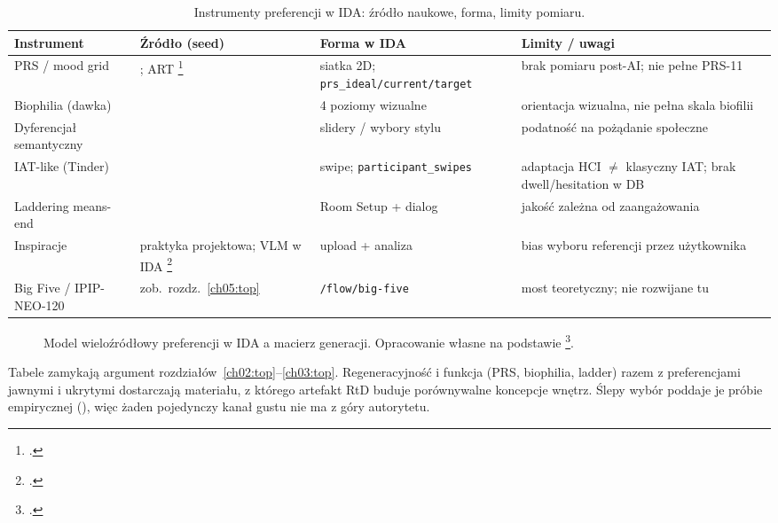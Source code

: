 \begin{table}[htbp]
  \centering
  \caption{Instrumenty preferencji w IDA: źródło naukowe, forma, limity pomiaru.}
  \label{tab:ch03:instruments}
  \begin{tabular}{@{}p{}p{}p{}p{}@{}}
    \toprule
    Instrument & Źródło (seed) & Forma w IDA & Limity / uwagi \\
    \midrule
    PRS / mood grid
      & \textcite{hartig1997prs}; ART \footcite{kaplan1995restorative}
      & siatka 2D; \texttt{prs\_ideal/current/target}
      & brak pomiaru post-AI; nie pełne PRS-11 \\
    Biophilia (dawka)
      & \textcite{kellert2008biophilic}
      & 4 poziomy wizualne
      & orientacja wizualna, nie pełna skala biofilii \\
    Dyferencjał semantyczny
      & \textcite{osgood1957measurement}
      & slidery / wybory stylu
      & podatność na pożądanie społeczne \\
    IAT-like (Tinder)
      & \textcite{greenwald1998iat}
      & swipe; \texttt{participant\_swipes}
      & adaptacja HCI $\neq$ klasyczny IAT; brak dwell/hesitation w DB \\
    Laddering means-end
      & \textcite{reynolds1988laddering}
      & Room Setup + dialog
      & jakość zależna od zaangażowania \\
    Inspiracje
      & praktyka projektowa; VLM w IDA \footcite{idaPlatform2026}
      & upload + analiza
      & bias wyboru referencji przez użytkownika \\
    Big Five / IPIP-NEO-120
      & zob.\ rozdz.~\ref{ch05:top}
      & \texttt{/flow/big-five}
      & most teoretyczny; nie rozwijane tu \\
    \bottomrule
  \end{tabular}
\end{table}

\begin{figure}[htbp]
  \centering
  \caption{Model wieloźródłowy preferencji w IDA a macierz generacji.
    Opracowanie własne na podstawie \footcite{idaPlatform2026}.}
  \label{fig:ch03:multisource}
\end{figure}

Tabele zamykają argument rozdziałów~\ref{ch02:top}--\ref{ch03:top}. Regeneracyjność i funkcja (PRS, biophilia, ladder) razem z preferencjami jawnymi i ukrytymi dostarczają materiału, z którego artefakt RtD buduje porównywalne koncepcje wnętrz. Ślepy wybór poddaje je próbie empirycznej (), więc żaden pojedynczy kanał gustu nie ma z góry autorytetu.

